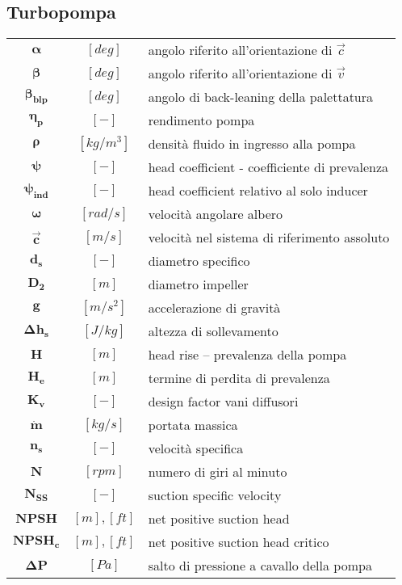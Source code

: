 \begin{multicols}{2}
	\subsection{Turbopompa}
	\begin{tabularx}{\linewidth}{cc>{\raggedright\arraybackslash}X}
		$\bm{\alpha}$ & $[deg]$ & angolo riferito all'orientazione di $\overrightarrow{c}$ \\
		$\bm{\beta}$ & $[deg]$ & angolo riferito all'orientazione di $\overrightarrow{v}$ \\
        $\bm{\beta_{blp}}$ & $[deg]$ & angolo di back-leaning della palettatura \\
		$\bm{\eta_p}$ & $[-]$ & rendimento pompa \\
        $\bm{\rho}$ & $[kg/m^3]$ & densità fluido in ingresso alla pompa \\
        $\bm{\psi}$ & $[-]$ & head coefficient - coefficiente di prevalenza \\
		$\bm{\psi_{ind}}$ & $[-]$ & head coefficient relativo al solo inducer \\
		$\bm{\omega}$ & $[rad/s]$ & velocità angolare albero \\
        $\bm{\overrightarrow{c}}$ & $[m/s]$ & velocità nel sistema di riferimento assoluto \\
	    $\bm{d_s}$ & $[-]$ & diametro specifico \\
		$\bm{D_2}$ & $[m]$ & diametro impeller \\
		$\bm{g}$ & $[m/s^2]$ & accelerazione di gravità \\
        $\bm{\Delta h_s}$ & $[J/kg]$ & altezza di sollevamento \\
        $\bm{H}$ & $[m]$ & head rise – prevalenza della pompa \\
		$\bm{H_e}$ & $[m]$ & termine di perdita di prevalenza \\
		$\bm{K_v}$ & $[-]$ & design factor vani diffusori \\
        $\bm{\dot m}$ & $[kg/s]$ & portata massica \\
        $\bm{n_s}$ & $[-]$ & velocità specifica \\
		$\bm{N}$ & $[rpm]$ & numero di giri al minuto \\
		$\bm{N_{SS}}$ & $[-]$ & suction specific velocity \\
    	$\bm{NPSH}$ & $[m], [ft]$ & net positive suction head \\
        $\bm{NPSH_c}$ & $[m], [ft]$ & net positive suction head critico \\
		$\bm{\Delta P}$ & $[Pa]$ & salto di pressione a cavallo della pompa \\

\end{tabularx}
\end{multicols}
